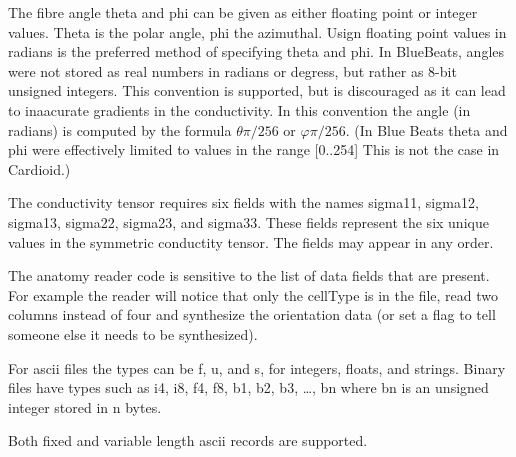 \documentclass{article}
\begin{document}
The fibre angle theta and phi can be given as either floating point or
integer values.  Theta is the polar angle, phi the azimuthal.  Usign
floating point values in radians is the preferred method of specifying
theta and phi.  In BlueBeats, angles were not stored as real numbers in
radians or degress, but rather as 8-bit unsigned integers.  This
convention is supported, but is discouraged as it can lead to inaacurate
gradients in the conductivity.  In this convention the angle (in
radians) is computed by the formula $\theta\pi/256$ or $\varphi\pi/256$.
(In Blue Beats theta and phi were effectively limited to values in the
range [0..254] This is not the case in Cardioid.)


The conductivity tensor requires six
fields with the names sigma11, sigma12, sigma13, sigma22, sigma23, and
sigma33.  These fields represent the six unique values in the symmetric
conductity tensor.  The fields may appear in any order.


The anatomy reader code is sensitive to the list of data fields
that are present.  For example the reader will notice that only the
cellType is in the file, read two columns instead of four and synthesize
the orientation data (or set a flag to tell someone else it needs to be
synthesized).

For ascii files the types can be f, u, and s, for integers, floats, and
strings.  Binary files have types such as i4, i8, f4, f8, b1, b2, b3, \ldots,
bn where bn is an unsigned integer stored in n bytes.


Both fixed and variable length ascii records are supported.
\end{document}
